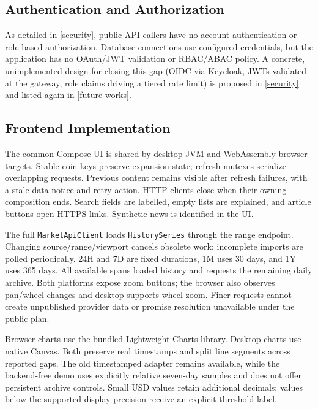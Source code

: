 \documentclass{scrartcl}
\begin{document}
\subsection{Authentication and Authorization}\label{impl-auth}

As detailed in \cref{security}, public API callers have no account authentication or
role-based authorization. Database connections use configured credentials, but the application
has no OAuth/JWT validation or RBAC/ABAC policy. A concrete,
unimplemented design for closing this gap (OIDC via Keycloak, JWTs validated at the gateway, role
claims driving a tiered rate limit) is proposed in \cref{security} and listed again in
\cref{future-works}.

\subsection{Frontend Implementation}\label{impl-frontend}

The common Compose UI is shared by desktop JVM and WebAssembly browser targets. Stable coin keys
preserve expansion state; refresh mutexes serialize overlapping requests. Previous content remains
visible after refresh failures, with a stale-data notice and retry action. HTTP clients close when
their owning composition ends. Search fields are labelled, empty lists are explained, and article
buttons open HTTPS links. Synthetic news is identified in the UI.

The full \texttt{MarketApiClient} loads \texttt{HistorySeries} through the range endpoint.
Changing source/range/viewport cancels obsolete work; incomplete imports are polled periodically.
24H and 7D are fixed durations, 1M uses 30 days, and 1Y uses 365 days. All available spans loaded
history and requests the remaining daily archive. Both platforms expose zoom buttons; the browser
also observes pan/wheel changes and desktop supports wheel zoom. Finer requests cannot create
unpublished provider data or promise resolution unavailable under the public plan.

Browser charts use the bundled Lightweight Charts library. Desktop charts use native Canvas.
Both preserve real timestamps and split line segments across reported gaps. The old timestamped
adapter remains available, while the backend-free demo uses explicitly relative seven-day samples
and does not offer persistent archive controls. Small USD values retain additional decimals;
values below the supported display precision receive an explicit threshold label.
\end{document}
